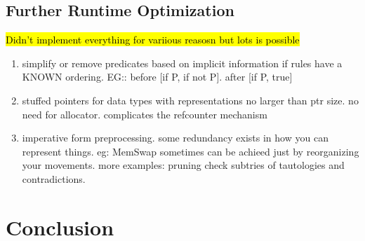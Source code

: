 \subsection{Further Runtime Optimization}
\hl{Didn't implement everything for variious reasosn but lots is possible}
\begin{enumerate}
	\item simplify or remove predicates based on implicit information if rules have a KNOWN ordering. EG:: before [if P, if not P]. after [if P, true]
	\item stuffed pointers for data types with representations no larger than ptr size. no need for allocator. complicates the refcounter mechanism
	\item imperative form preprocessing. some redundancy exists in how you can represent things. eg: MemSwap sometimes can be achieed just by reorganizing your movements. more examples: pruning check subtries of tautologies and contradictions.
\end{enumerate}

\section{Conclusion}
